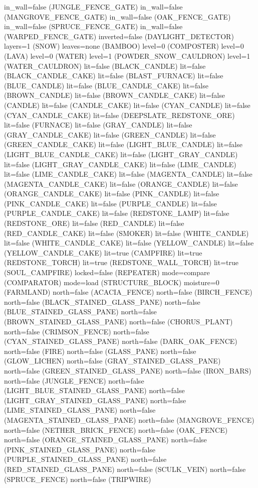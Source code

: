 \documentclass[11pt]{article}
\begin{document}
in_wall=false (JUNGLE_FENCE_GATE)
in_wall=false (MANGROVE_FENCE_GATE)
in_wall=false (OAK_FENCE_GATE)
in_wall=false (SPRUCE_FENCE_GATE)
in_wall=false (WARPED_FENCE_GATE)
inverted=false (DAYLIGHT_DETECTOR)
layers=1 (SNOW)
leaves=none (BAMBOO)
level=0 (COMPOSTER)
level=0 (LAVA)
level=0 (WATER)
level=1 (POWDER_SNOW_CAULDRON)
level=1 (WATER_CAULDRON)
lit=false (BLACK_CANDLE)
lit=false (BLACK_CANDLE_CAKE)
lit=false (BLAST_FURNACE)
lit=false (BLUE_CANDLE)
lit=false (BLUE_CANDLE_CAKE)
lit=false (BROWN_CANDLE)
lit=false (BROWN_CANDLE_CAKE)
lit=false (CANDLE)
lit=false (CANDLE_CAKE)
lit=false (CYAN_CANDLE)
lit=false (CYAN_CANDLE_CAKE)
lit=false (DEEPSLATE_REDSTONE_ORE)
lit=false (FURNACE)
lit=false (GRAY_CANDLE)
lit=false (GRAY_CANDLE_CAKE)
lit=false (GREEN_CANDLE)
lit=false (GREEN_CANDLE_CAKE)
lit=false (LIGHT_BLUE_CANDLE)
lit=false (LIGHT_BLUE_CANDLE_CAKE)
lit=false (LIGHT_GRAY_CANDLE)
lit=false (LIGHT_GRAY_CANDLE_CAKE)
lit=false (LIME_CANDLE)
lit=false (LIME_CANDLE_CAKE)
lit=false (MAGENTA_CANDLE)
lit=false (MAGENTA_CANDLE_CAKE)
lit=false (ORANGE_CANDLE)
lit=false (ORANGE_CANDLE_CAKE)
lit=false (PINK_CANDLE)
lit=false (PINK_CANDLE_CAKE)
lit=false (PURPLE_CANDLE)
lit=false (PURPLE_CANDLE_CAKE)
lit=false (REDSTONE_LAMP)
lit=false (REDSTONE_ORE)
lit=false (RED_CANDLE)
lit=false (RED_CANDLE_CAKE)
lit=false (SMOKER)
lit=false (WHITE_CANDLE)
lit=false (WHITE_CANDLE_CAKE)
lit=false (YELLOW_CANDLE)
lit=false (YELLOW_CANDLE_CAKE)
lit=true (CAMPFIRE)
lit=true (REDSTONE_TORCH)
lit=true (REDSTONE_WALL_TORCH)
lit=true (SOUL_CAMPFIRE)
locked=false (REPEATER)
mode=compare (COMPARATOR)
mode=load (STRUCTURE_BLOCK)
moisture=0 (FARMLAND)
north=false (ACACIA_FENCE)
north=false (BIRCH_FENCE)
north=false (BLACK_STAINED_GLASS_PANE)
north=false (BLUE_STAINED_GLASS_PANE)
north=false (BROWN_STAINED_GLASS_PANE)
north=false (CHORUS_PLANT)
north=false (CRIMSON_FENCE)
north=false (CYAN_STAINED_GLASS_PANE)
north=false (DARK_OAK_FENCE)
north=false (FIRE)
north=false (GLASS_PANE)
north=false (GLOW_LICHEN)
north=false (GRAY_STAINED_GLASS_PANE)
north=false (GREEN_STAINED_GLASS_PANE)
north=false (IRON_BARS)
north=false (JUNGLE_FENCE)
north=false (LIGHT_BLUE_STAINED_GLASS_PANE)
north=false (LIGHT_GRAY_STAINED_GLASS_PANE)
north=false (LIME_STAINED_GLASS_PANE)
north=false (MAGENTA_STAINED_GLASS_PANE)
north=false (MANGROVE_FENCE)
north=false (NETHER_BRICK_FENCE)
north=false (OAK_FENCE)
north=false (ORANGE_STAINED_GLASS_PANE)
north=false (PINK_STAINED_GLASS_PANE)
north=false (PURPLE_STAINED_GLASS_PANE)
north=false (RED_STAINED_GLASS_PANE)
north=false (SCULK_VEIN)
north=false (SPRUCE_FENCE)
north=false (TRIPWIRE)
\end{document}
